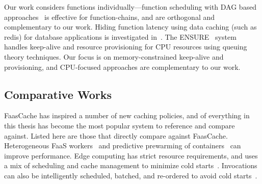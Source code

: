 %
Our work considers functions individually---function scheduling with DAG based approaches~\cite{carver_search_2019} is effective for function-chains, and are orthogonal and complementary to our work. 
%
Hiding function latency using data caching (such as redis) for database applications is investigated in~\cite{ghosh_caching_2019}. 
The ENSURE~\cite{ensure_acsos20} system handles keep-alive and resource provisioning for CPU resources using queuing theory techniques.
Our focus is on memory-constrained keep-alive and provisioning, and CPU-focused approaches are complementary to our work. 

\subsection{Comparative Works}

FaasCache has inspired a number of new caching policies, and of everything in this thesis has become the most popular system to reference and compare against.
Listed here are those that directly compare against FaasCache.
Heterogeneous FaaS workers~\cite{roy2022icebreaker} and predictive prewarming of containers~\cite{saha2024fase} can improve performance.
Edge computing has strict resource requirements, and uses a mix of scheduling and cache management to minimize cold starts~\cite{zhang2023online,chen2024cross}.
Invocations can also be intelligently scheduled, batched, and re-ordered to avoid cold starts~\cite{wu2024faasbatch,cai2024incendio}.

\begin{comment}
\noindent \textbf{Caching.}
Our choice of Greedy-Dual-Size-Frequency was motivated by the ease with which its parameters mapped to function keep-alive, in particular the frequency vs. size tradeoff.
Cache eviction algorithms have a long history, although the focus has predominantly on uniform sized objects (such as disk blocks, RAM pages, cache lines, etc.).
Certain caching optimizations relying on spatial locality (such as look-ahead and ARC) are not directly applicable to keep-alive. 
The size-aware cache algorithms and models used for web-caches, proxies, and CDNs form the basis of our work. 
Cache provisioning using hit/miss ratio curves is a common approach, and these curves can also be constructed dynamically, which is part of our future work.
%
\end{comment}

